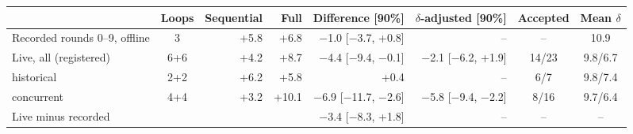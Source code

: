 \begin{tabular}{@{}lcrrrrcc@{}}
\toprule
 & Loops & Sequential & Full & Difference [90\%] & $\delta$-adjusted [90\%] & Accepted & Mean $\delta$ \\
\midrule
Recorded rounds 0--9, offline & 3 & +5.8 & +6.8 & $-$1.0 [$-$3.7, +0.8] & -- & -- & 10.9 \\
Live, all (registered) & 6+6 & +4.2 & +8.7 & $-$4.4 [$-$9.4, $-$0.1] & $-$2.1 [$-$6.2, +1.9] & 14/23 & 9.8/6.7 \\
\quad historical & 2+2 & +6.2 & +5.8 & +0.4 & -- & 6/7 & 9.8/7.4 \\
\quad concurrent & 4+4 & +3.2 & +10.1 & $-$6.9 [$-$11.7, $-$2.6] & $-$5.8 [$-$9.4, $-$2.2] & 8/16 & 9.7/6.4 \\
\midrule
Live minus recorded & & & & $-$3.4 [$-$8.3, +1.8] & -- & -- & -- \\
\bottomrule
\end{tabular}
